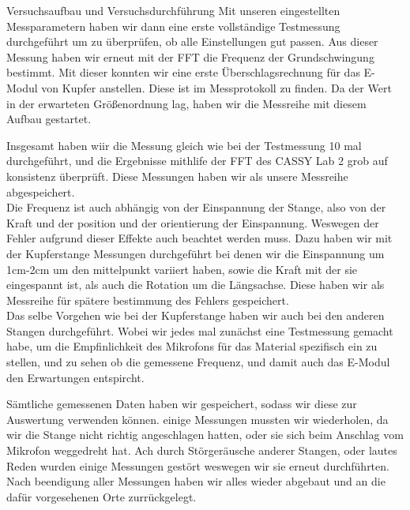 \documentclass[twoside]{protokoll}
\begin{document}
\begin{aufgabe}{Versuchsaufbau und Versuchsdurchführung}
Mit unseren eingestellten Messparametern haben wir dann eine erste vollständige Testmessung durchgeführt um zu überprüfen, ob alle Einstellungen gut passen. Aus dieser Messung haben wir erneut mit der FFT die Frequenz der Grundschwingung bestimmt. Mit dieser konnten wir eine erste Überschlagsrechnung für das E-Modul von Kupfer anstellen.
Diese ist im Messprotokoll zu finden. Da der Wert in der erwarteten Größenordnung lag, haben wir die Messreihe mit diesem Aufbau gestartet. 


Insgesamt haben wiir die Messung gleich wie bei der Testmessung 10 mal durchgeführt, und die Ergebnisse mithlife der FFT des CASSY Lab 2 grob auf konsistenz überprüft. Diese Messungen haben wir als unsere Messreihe abgespeichert.\\

Die Frequenz ist auch abhängig von der Einspannung der Stange, also von der Kraft und der position und der orientierung der Einspannung. Weswegen der Fehler aufgrund dieser Effekte auch beachtet werden muss. Dazu haben wir mit der Kupferstange Messungen durchgeführt bei denen wir die Einspannung um 1cm-2cm um den mittelpunkt variiert haben, sowie die Kraft mit der sie eingespannt ist, als auch die Rotation um die Längsachse.
Diese haben wir als Messreihe für spätere bestimmung des Fehlers gespeichert.\\

Das selbe Vorgehen wie bei der Kupferstange haben wir auch bei den anderen Stangen durchgeführt. Wobei wir jedes mal zunächst eine Testmessung gemacht habe, um die Empfinlichkeit des Mikrofons für das Material spezifisch ein zu stellen, und zu sehen ob die gemessene Frequenz, und damit auch das E-Modul den Erwartungen entspircht. 

Sämtliche gemessenen Daten haben wir gespeichert, sodass wir diese zur Auswertung verwenden können. einige Messungen mussten wir wiederholen, da wir die Stange nicht richtig angeschlagen hatten, oder sie sich beim Anschlag vom Mikrofon weggedreht hat. Ach durch Störgeräusche anderer Stangen, oder lautes Reden wurden einige Messungen gestört weswegen wir sie erneut durchführten.\\

Nach beendigung aller Messungen haben wir alles wieder abgebaut und an die dafür vorgesehenen Orte zurrückgelegt. 


\end{aufgabe}
\end{document}
